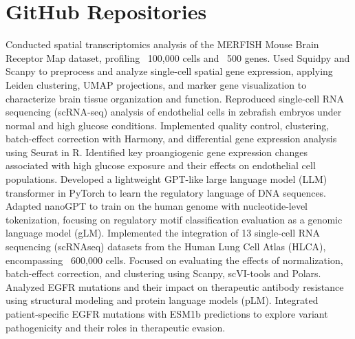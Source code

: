 \documentclass[11pt,a4paper,sans]{moderncv}
\begin{document}
\section{GitHub Repositories}
    {{\footnotesize Conducted spatial transcriptomics analysis of the MERFISH Mouse Brain Receptor Map dataset, profiling ~100,000 cells and ~500 genes. Used Squidpy and Scanpy to preprocess and analyze single-cell spatial gene expression, applying Leiden clustering, UMAP projections, and marker gene visualization to characterize brain tissue organization and function.}}{}{}  
    {}
    {{\footnotesize Reproduced single-cell RNA sequencing (scRNA-seq) analysis of endothelial cells in zebrafish embryos under normal and high glucose conditions. Implemented quality control, clustering, batch-effect correction with Harmony, and differential gene expression analysis using Seurat in R. Identified key proangiogenic gene expression changes associated with high glucose exposure and their effects on endothelial cell populations.}}{}{}
    {}
    {{\footnotesize Developed a lightweight GPT-like large language model (LLM) transformer in PyTorch to learn the regulatory language of DNA sequences. Adapted nanoGPT to train on the human genome with nucleotide-level tokenization, focusing on regulatory motif classification evaluation as a genomic language model (gLM).}}{}{}
    {}
    {{\footnotesize Implemented the integration of 13 single-cell RNA sequencing (scRNAseq) datasets from the Human Lung Cell Atlas (HLCA), encompassing ~600,000 cells. Focused on evaluating the effects of normalization, batch-effect correction, and clustering using Scanpy, scVI-tools and Polars.}}{}{}
    {}
    {{\footnotesize Analyzed EGFR mutations and their impact on therapeutic antibody resistance using structural modeling and protein language models (pLM). Integrated patient-specific EGFR mutations with ESM1b predictions to explore variant pathogenicity and their roles in therapeutic evasion.}}{}{}
    {}
\end{document}
